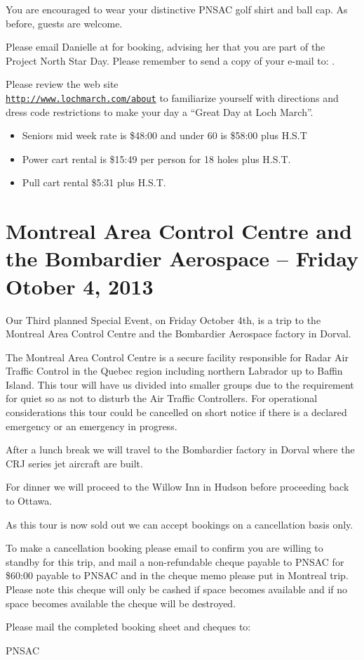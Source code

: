 You are encouraged to wear your distinctive PNSAC golf shirt and ball
cap.  As before, guests are welcome.
 
Please email Danielle at  for booking, advising
her that you are part of the Project North Star Day.  Please remember
to send a copy of your e-mail to: .
 
Please review the web site\\
{\color{blue}\texttt{\url{http://www.lochmarch.com/about}}} to
familiarize yourself with directions and dress code restrictions to
make your day a ``Great Day at Loch March''.

\begin{itemize}
  \item Seniors mid week rate is \$48:00 and under 60 is \$58:00 plus
    H.S.T
  \item Power cart rental is \$15:49 per person for 18 holes plus
    H.S.T.
  \item Pull cart rental \$5:31 plus H.S.T.
\end{itemize}


\section{Montreal Area Control Centre and the Bombardier Aerospace  --
Friday Otober 4, 2013}
\label{sec:montreal}

Our Third planned Special Event, on Friday October 4th, is a trip to
the Montreal Area Control Centre and the Bombardier Aerospace factory
in Dorval.

The Montreal Area Control Centre is a secure facility responsible for
Radar Air Traffic Control in the Quebec region including northern
Labrador up to Baffin Island. This tour will have us divided into
smaller groups due to the requirement for quiet so as not to disturb
the Air Traffic Controllers. For operational considerations this tour
could be cancelled on short notice if there is a declared emergency or
an emergency in progress.

After a lunch break we will travel to the Bombardier factory in Dorval
where the CRJ series jet aircraft are built.

For dinner we will proceed to the Willow Inn in Hudson before
proceeding back to Ottawa.

As this tour is now sold out we can accept bookings on a cancellation
basis only.

To make a cancellation booking please email
 to confirm you are willing to standby
for this trip, and mail a non-refundable cheque payable to PNSAC for
\$60:00 payable to PNSAC and in the cheque memo please put in Montreal
trip. Please note this cheque will only be cashed if space becomes
available and if no space becomes available the cheque will be
destroyed.

Please mail the completed booking sheet and cheques to:

\address{PNSAC\\
P.O.Box 44005\\
514 Montreal Road\\
Ottawa, ON\\
K1K 4P8}

\begin{footnotesize}
    \raggedleft PNSAC\\
\end{footnotesize}

